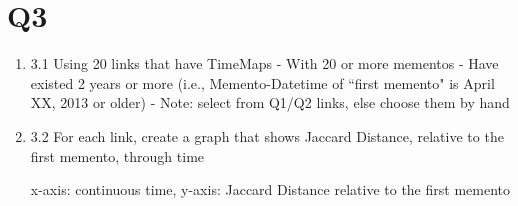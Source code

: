 

\section{Q3}
\label{part3}
\begin{enumerate}

\item 3.1 Using 20 links that have TimeMaps
\subitem - With 20 or more mementos
\subitem - Have existed 2 years or more (i.e., Memento-Datetime of ``first memento" is April XX, 2013 or older)
\subitem - Note: select from Q1/Q2 links, else choose them by hand

\item 3.2 For each link, create a graph that shows Jaccard Distance, relative to the first memento, through time

\subitem x-axis: continuous time, y-axis: Jaccard Distance relative to the first memento



\end{enumerate}

